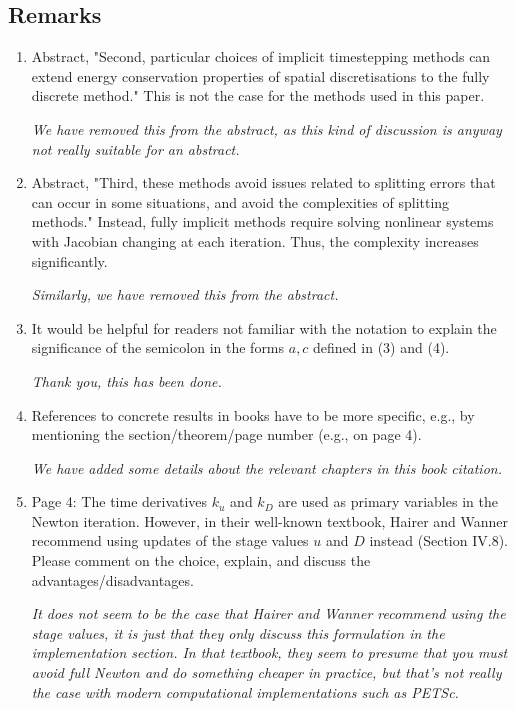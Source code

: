 \documentclass[a4paper,12pt]{article}
\begin{document}
\subsection{Remarks}
\begin{enumerate}
\item  Abstract, "Second, particular choices of implicit timestepping methods can extend energy conservation properties of spatial discretisations to the fully discrete method." This is not the case for the methods used in this paper.

  \emph{We have removed this from the abstract, as this kind of discussion is
  anyway not really suitable for an abstract.}
  
\item  Abstract, "Third, these methods avoid issues related to splitting errors that can occur in some situations, and avoid the complexities of splitting methods." Instead, fully implicit methods require solving nonlinear systems with Jacobian changing at each iteration. Thus, the complexity increases significantly.

  \emph{Similarly, we have removed this from the abstract.}
  
\item  It would be helpful for readers not familiar with the notation to explain the significance of the semicolon in the forms $a, c$ defined in (3) and (4).

\emph{Thank you, this has been done.}
  
\item  References to concrete results in books have to be more specific, e.g., by mentioning the section/theorem/page number (e.g., on page 4).

\emph{We have added some details about the relevant chapters in this book citation.}
  
\item Page 4: The time derivatives $k_u$ and $k_D$ are used as primary
  variables in the Newton iteration. However, in their well-known
  textbook, Hairer and Wanner recommend using updates of the stage
  values $u$ and $D$ instead (Section IV.8). Please comment on the
  choice, explain, and discuss the advantages/disadvantages.\\
  {\itshape It does not seem to be the case that Hairer and Wanner
  recommend using the stage values, it is just that they only discuss
  this formulation in the implementation section. In that textbook,
  they seem to presume that you must avoid full Newton and do
  something cheaper in practice, but that's not really the case with
  modern computational implementations such as PETSc.

}
\end{enumerate}
\end{document}
